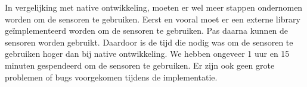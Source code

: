 In vergelijking met native ontwikkeling, moeten er wel meer stappen ondernomen worden om de 
sensoren te gebruiken. Eerst en vooral moet er een externe library geïmplementeerd worden 
om de sensoren te gebruiken. Pas daarna kunnen de sensoren worden gebruikt. Daardoor is de tijd die nodig
was om de sensoren te gebruiken hoger dan bij native ontwikkeling. We hebben ongeveer
1 uur en 15 minuten gespendeerd om de sensoren te gebruiken. Er zijn ook geen grote problemen of
bugs voorgekomen tijdens de implementatie.
